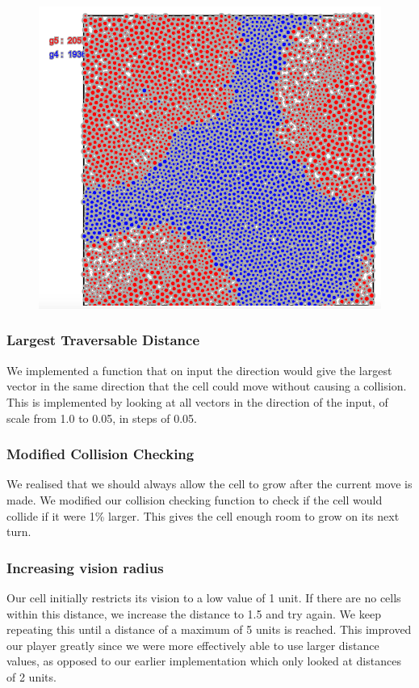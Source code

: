 \begin{figure}[h]
\center
\includegraphics[scale=0.3]{random2.png}
\caption{}
\label{fig:random2}
\end{figure}

\subsubsection{Largest Traversable Distance}
We implemented a function that on input the direction would give the largest vector in the same direction that the cell could move without causing a collision. This is implemented by looking at all vectors in the direction of the input, of scale from 1.0 to 0.05, in steps of 0.05.

\subsubsection{Modified Collision Checking}
We realised that we should always allow the cell to grow after the current move is made. We modified our collision checking function to check if the cell would collide if it were 1\% larger. This gives the cell enough room to grow on its next turn.

\subsubsection{Increasing vision radius}
Our cell initially restricts its vision to a low value of 1 unit. If there are no cells within this distance, we increase the distance to 1.5 and try again. We keep repeating this until a distance of a maximum of 5 units is reached. This improved our player greatly since we were more effectively able to use larger distance values, as opposed to our earlier implementation which only looked at distances of 2 units.

